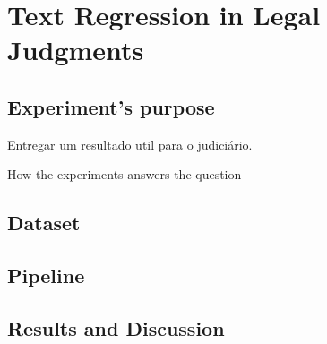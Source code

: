 \section{Text Regression in Legal Judgments}

\subsection{Experiment's purpose}

Entregar um resultado util para o judiciário.

How the experiments answers the question

\subsection{Dataset}

\cite{Sabo2021}

\subsection{Pipeline}

\subsection{Results and Discussion}